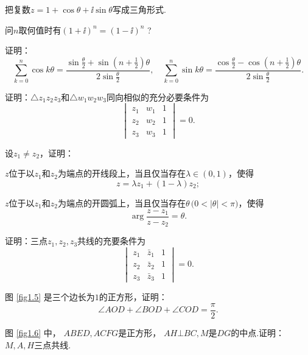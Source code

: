 \begin{xiti}\hypertarget{xiti1.2}{}
 \item 把复数$z=1+\cos\theta+\ii\sin\theta$写成三角形式.
 \item 问$n$取何值时有$(1+\ii)^n=(1-\ii)^n$ ?
 \item 证明：
   \[
     \sum_{k=0}^n\cos k\theta = \frac{\sin\frac\theta2 + \sin\left(n+\frac12\right)\theta}{2\sin\frac\theta2},\quad
     \sum_{k=0}^n\sin k\theta = \frac{\cos\frac\theta2 - \cos\left(n+\frac12\right)\theta}{2\sin\frac\theta2}.
   \]
 \item 证明：$\triangle z_1z_2z_3$和$\triangle w_1w_2w_3$同向相似的充分必要条件为
   \[
     \begin{vmatrix}
     z_1 & w_1 & 1 \\
     z_2 & w_2 & 1 \\
     z_3 & w_3 & 1
     \end{vmatrix}=0.
   \]
 \item 设$z_1\ne z_2$，证明：
  \begin{enuma}
    \item $z$位于以$z_1$和$z_2$为端点的开线段上，当且仅当存在$\lambda\in (0,1)$，使得
       \[
         z = \lambda z_1 + (1 - \lambda)z_2;
       \]
    \item $z$位于以$z_1$和$z_2$为端点的开圆弧上，当且仅当存在$\theta\,\big(0<|\theta|<\pi\big)$，使得
       \[
         \arg\frac{z-z_1}{z-z_2} = \theta.
       \]
  \end{enuma}
 \item 证明：三点$z_1,z_2,z_3$共线的充要条件为
   \[
     \begin{vmatrix}
       z_1 & \bar z_1 & 1 \\
       z_2 & \bar z_2 & 1 \\
       z_3 & \bar z_3 & 1
     \end{vmatrix}=0.
   \]
 \item 图 \ref{fig1.5} 是三个边长为$1$的正方形，证明：
   \[
     \angle AOD + \angle BOD + \angle COD = \frac\pi2.
   \]
 \item 图 \ref{fig1.6} 中， $ABED,ACFG$是正方形， $AH\bot BC,M$是$DG$的中点.证明： $M,A,H$三点共线.
   \begin{figure}[!ht]
     \begin{minipage}[b]{0.48\textwidth}
       \centering
\end{minipage}
\end{figure}
\end{xiti}
